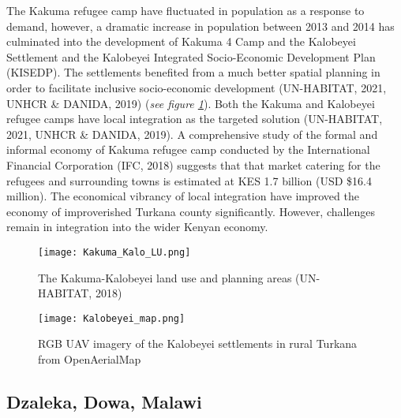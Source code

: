 \documentclass[11pt, a4paper, twoside]{report}
\begin{document}
The Kakuma refugee camp have fluctuated in population as a response to demand, however, a dramatic increase in population between 2013 and 2014 has culminated into the development of Kakuma 4 Camp and the Kalobeyei Settlement and the Kalobeyei Integrated Socio-Economic Development Plan (KISEDP). The settlements benefited from a much better spatial planning in order to facilitate inclusive socio-economic development (UN-HABITAT, 2021, UNHCR \& DANIDA, 2019) (\textit{see figure \ref{fig:KU_KALO_LU}}). Both the Kakuma and Kalobeyei refugee camps have local integration as the targeted solution (UN-HABITAT, 2021, UNHCR \& DANIDA, 2019). A comprehensive study of the formal and informal economy of Kakuma refugee camp conducted by the International Financial Corporation (IFC, 2018) suggests that that market catering for the refugees and surrounding towns is estimated at KES 1.7 billion (USD \$16.4 million). The economical vibrancy of local integration have improved the economy of improverished Turkana county significantly. However, challenges remain in integration into the wider Kenyan economy.\\\par

\begin{figure}[H]
  \centering
  \texttt{[image: Kakuma\_Kalo\_LU.png]}
  \caption{The Kakuma-Kalobeyei land use and planning areas (UN-HABITAT, 2018)}
  \label{fig:KU_KALO_LU}
\end{figure}

\begin{figure}[H]
  \centering
  \texttt{[image: Kalobeyei\_map.png]}
  \caption{RGB UAV imagery of the Kalobeyei settlements in rural Turkana from OpenAerialMap}
  \label{fig:KBY_overview}
\end{figure}

\subsection{Dzaleka, Dowa, Malawi}\label{Dzaleka}
\end{document}
